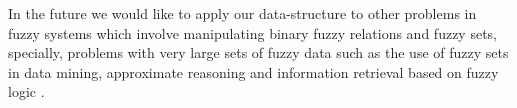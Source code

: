 \documentclass[4pt]{article}
\begin{document}
In the future we would like to apply our data-structure to other problems in fuzzy systems which involve manipulating binary fuzzy relations and fuzzy sets, specially, problems with very large sets of fuzzy data such as the use of fuzzy sets in data mining, approximate reasoning and information retrieval based on fuzzy logic \cite{fdm,fim,supervised_fuzzy_classification,sabio}.
\\



\end{document}
